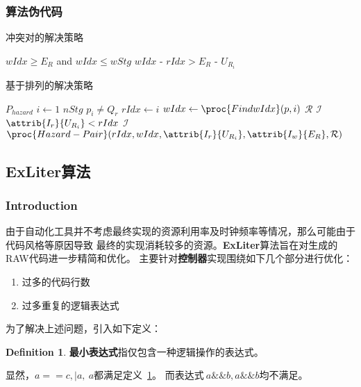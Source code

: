 \documentclass[hyperref,UTF8]{ctexart}
\theoremstyle{definition}
\newtheorem{defn}[thm]{Definition}
\theoremstyle{remark}
\numberwithin{equation}{subsection}
\newcommand{\Emph}{\textbf}
\begin{document}
	
\subsubsection{算法伪代码}	
	
	冲突对的解决策略
	\begin{codebox}
	\li		\If $wIdx \ge E_R$ and $wIdx \le wStg$
	\li			\Then {}
	\li		\ElseIf $wIdx \text{ - } rIdx > E_R \text{ - } U_{R_i}$
	\li			\Then {}
	\li		\ElseNoIf
			\End
    \end{codebox}
	
	
	基于排列的解决策略
	\begin{codebox}
	\li	\For {}  $P_{hazard}$
	\li	\Do
			\For $i \gets 1$ \To $nStg$
	\li		\Do
				\If $p_i \neq Q_r$
	\li				\Then {}
					\End
	\li			$rIdx \gets i$
	\li			$wIdx \gets	\proc{FindwIdx}(p, i)$
	\li			\For {}  $\mathcal{R}$
	\li				\Do
						\For {}  
	\li					\Do
							\For {}  $\mathcal{I}$
	\li							\Do
									\If $\attrib{I_r}{U_{R_i}} < rIdx$
	\li								\Then {}
									\End
	\li								\For \id{I_w} \kw{In} $\mathcal{I}$
	\li									\Do
											$\proc{Hazard-Pair}(rIdx, wIdx, \attrib{I_r}{U_{R_i}}, \attrib{I_w}{E_R}, \mathcal{R})$
										\End
								\End
						\End
					\End
			\End
		\End
	\end{codebox}
	
\subsection{ExLiter算法}

\subsubsection{Introduction}

	由于自动化工具并不考虑最终实现的资源利用率及时钟频率等情况，那么可能由于代码风格等原因导致
	最终的实现消耗较多的资源。\Emph{ExLiter}算法旨在对生成的RAW代码进一步精简和优化。
	主要针对\Emph{控制器}实现围绕如下几个部分进行优化：
	\begin{enumerate}[(1)]
		\item 过多的代码行数
		\item 过多重复的逻辑表达式
	\end{enumerate}
    为了解决上述问题，引入如下定义：
    \begin{defn}
    \label{defn:least_exp}
    \Emph{最小表达式}指仅包含一种逻辑操作的表达式。
    \end{defn}
    显然，$a==c, |a, ~a$都满足定义~\ref{defn:least_exp}。
    而表达式$~a\&\&b, a\&\&b$均不满足。
\end{document}
